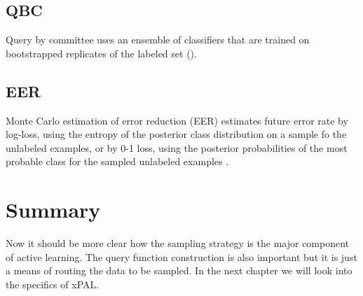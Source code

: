 \subsection{QBC}
Query by committee uses an ensemble of classifiers that are trained on bootstrapped replicates of the labeled set (\cite{seung1992qbc}).

\subsection{EER}
Monte Carlo estimation of error reduction (EER) estimates future error rate by log-loss, using the entropy of the posterior class distribution on a sample fo the unlabeled examples, or by 0-1 loss, using the posterior probabilities of the most probable class for the sampled unlabeled examples \cite{roy2001eer}.

\section{Summary}
Now it should be more clear how the sampling strategy is the major component of active learning. The query function construction is also important but it is just a means of routing the data to be sampled. In the next chapter we will look into the specifics of xPAL.
